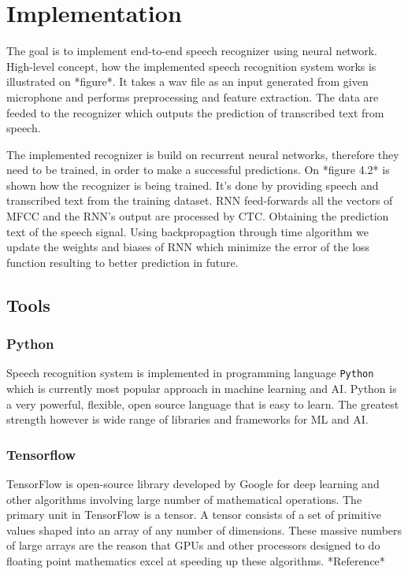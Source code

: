 \chapter{Implementation}

The goal is to implement end-to-end speech recognizer using neural network.
High-level concept, how the implemented speech recognition system works is illustrated on *figure*.
It takes a wav file as an input generated from given microphone and performs preprocessing and feature extraction.
The data are feeded to the recognizer which outputs the prediction of transcribed text from speech.


The implemented recognizer is build on recurrent neural networks, therefore they need to be trained, in order to make a successful predictions.
On *figure 4.2* is shown how the recognizer is being trained.
It's done by providing speech and transcribed text from the training dataset.
RNN feed-forwards all the vectors of MFCC and the RNN's output are processed by CTC. Obtaining the prediction text of the speech signal.
Using backpropagtion through time algorithm we update the weights and biases of RNN which minimize the error of the loss function resulting to better prediction in future.



\section{Tools}

\subsection{Python}

Speech recognition system is implemented in programming language \texttt{Python} which is currently most popular approach in machine learning and AI.
Python is a very powerful, flexible, open source language that is easy to learn.
The greatest strength however is wide range of libraries and frameworks for ML and AI.

\subsection{Tensorflow}

TensorFlow is open-source library developed by Google for deep learning and other algorithms involving large number of mathematical operations.
The primary unit in TensorFlow is a tensor.
A tensor consists of a set of primitive values shaped into an array of any number of dimensions.
These massive numbers of large arrays are the reason that GPUs and other processors designed to do floating point mathematics excel at speeding up these algorithms. *Reference*

